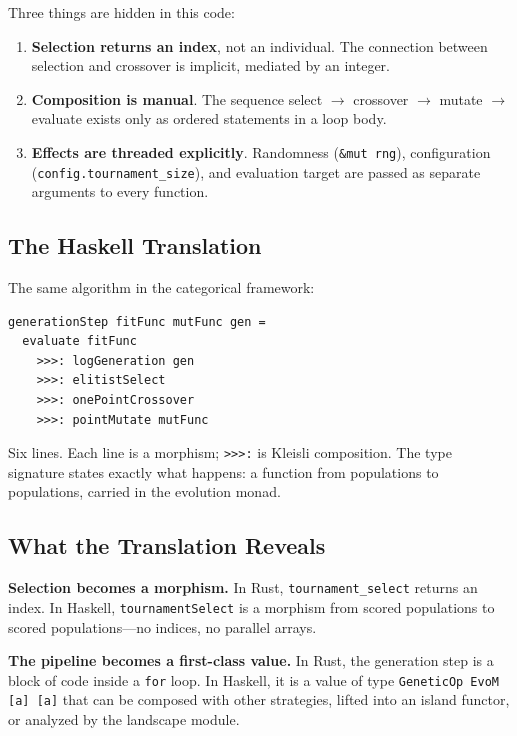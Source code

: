 \documentclass[dvipsnames,format=sigconf,anonymous=false,review=false]{acmart}
\begin{document}
Three things are hidden in this code:

\begin{enumerate}[nosep]
  \item \textbf{Selection returns an index}, not an individual. The connection between selection and crossover is implicit, mediated by an integer.
  \item \textbf{Composition is manual}. The sequence select $\to$ crossover $\to$ mutate $\to$ evaluate exists only as ordered statements in a loop body.
  \item \textbf{Effects are threaded explicitly}. Randomness (\texttt{\&mut rng}), configuration (\texttt{config.tournament\_size}), and evaluation target are passed as separate arguments to every function.
\end{enumerate}

\subsection{The Haskell Translation}

The same algorithm in the categorical framework:

\begin{lstlisting}[style=haskellstyle]
generationStep fitFunc mutFunc gen =
  evaluate fitFunc
    >>>: logGeneration gen
    >>>: elitistSelect
    >>>: onePointCrossover
    >>>: pointMutate mutFunc
\end{lstlisting}

Six lines. Each line is a morphism; \texttt{>{>}{>}:} is Kleisli composition. The type signature states exactly what happens: a function from populations to populations, carried in the evolution monad.

\subsection{What the Translation Reveals}

\textbf{Selection becomes a morphism.} In Rust, \texttt{tournament\_select} returns an index. In Haskell, \texttt{tournamentSelect} is a morphism from scored populations to scored populations---no indices, no parallel arrays.

\textbf{The pipeline becomes a first-class value.} In Rust, the generation step is a block of code inside a \texttt{for} loop. In Haskell, it is a value of type \texttt{GeneticOp EvoM [a] [a]} that can be composed with other strategies, lifted into an island functor, or analyzed by the landscape module.
\end{document}
